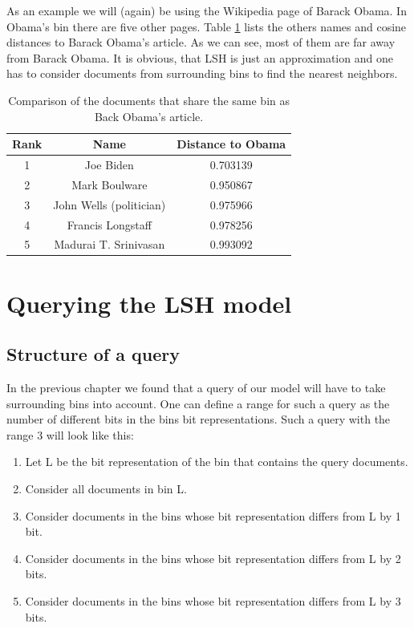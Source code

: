 \documentclass[12pt]{scrreprt}
\begin{document}
As an example we will (again) be using the Wikipedia page of Barack Obama. In Obama's bin there are five other pages. Table \ref{tab:compare_top_words} lists the others names and cosine distances to Barack Obama's article. As we can see, most of them are far away from Barack Obama. It is obvious, that LSH is just an approximation and one has to consider documents from surrounding bins to find the nearest neighbors.

\begin{table}[H]
  \caption{Comparison of the documents that share the same bin as Back Obama's article.}
  \label{tab:compare_top_words}
  \begin{center}
    \begin{tabular}{| c | c | c |}
      \hline
      \textbf{Rank} & \textbf{Name} & \textbf{Distance to Obama}\\
      \hline
      \hline
      1 & Joe Biden & 0.703139 \\ \hline
      2 & Mark Boulware & 0.950867 \\ \hline
      3 & John Wells (politician) & 0.975966 \\ \hline
      4 & Francis Longstaff & 0.978256 \\ \hline
      5 & Madurai T. Srinivasan & 0.993092 \\ \hline
    \end{tabular}	
  \end{center}
\end{table}

\chapter{Querying the LSH model}
\section{Structure of a query}
In the previous chapter we found that a query of our model will have to take surrounding bins into account. One can define a range for such a query as the number of different bits in the bins bit representations. Such a query with the range 3 will look like this:\\
\begin{center}
\begin{enumerate}
\item[1.] Let L be the bit representation of the bin that contains the query documents.
\item[2.] Consider all documents in bin L.
\item[3.] Consider documents in the bins whose bit representation differs from L by 1 bit.
\item[4.] Consider documents in the bins whose bit representation differs from L by 2 bits.
\item[5.] Consider documents in the bins whose bit representation differs from L by 3 bits.
\end{enumerate}
\end{center}
\end{document}
